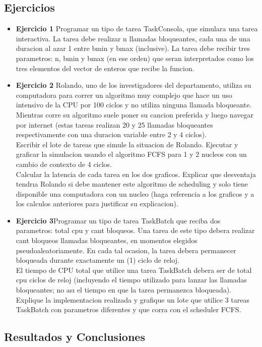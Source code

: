 
\subsection{Ejercicios}
\begin{itemize}
 \item \textbf{Ejercicio 1 } Programar un tipo de tarea TaskConsola, que simulara una tarea interactiva.
La tarea debe realizar n llamadas bloqueantes, cada una de una duracion al azar 1 entre bmin
y bmax (inclusive). La tarea debe recibir tres parametros: n, bmin y bmax (en ese orden) que
seran interpretados como los tres elementos del vector de enteros que recibe la funcion.
\item \textbf{Ejercicio 2} Rolando, uno de los investigadores del departamento, utiliza su computadora
para correr un algoritmo muy complejo que hace un uso intensivo de la CPU por 100 ciclos
y no utiliza ninguna llamada bloqueante. Mientras corre su algoritmo suele poner su cancion
preferida y luego navegar por internet (estas tareas realizan 20 y 25 llamadas bloqueantes
respectivamente con una duracion variable entre 2 y 4 ciclos).\\
Escribir el lote de tareas que simule la situacion de Rolando. Ejecutar y graficar la simulacion
usando el algoritmo FCFS para 1 y 2 nucleos con un cambio de contexto de 4 ciclos.\\
Calcular la latencia de cada tarea en los dos graficos. Explicar que desventaja tendrıa Rolando
si debe mantener este algoritmo de scheduling y solo tiene disponible una computadora con un
nucleo (haga referencia a los graficos y a los calculos anteriores para justificar su explicacion).
\item \textbf{Ejercicio 3}Programar un tipo de tarea TaskBatch que reciba dos parametros: total cpu y
cant bloqueos. Una tarea de este tipo debera realizar cant bloqueos llamadas bloqueantes, en
momentos elegidos pseudoaleatoriamente. En cada tal ocasion, la tarea debera permanecer
bloqueada durante exactamente un (1) ciclo de reloj. \\
El tiempo de CPU total que utilice una
tarea TaskBatch debera ser de total cpu ciclos de reloj (incluyendo el tiempo utilizado para
lanzar las llamadas bloqueantes; no ası el tiempo en que la tarea permanezca bloqueada).
Explique la implementacion realizada y grafique un lote que utilice 3 tareas TaskBatch con
parametros diferentes y que corra con el scheduler FCFS.
\end{itemize}

\subsection{Resultados y Conclusiones}

